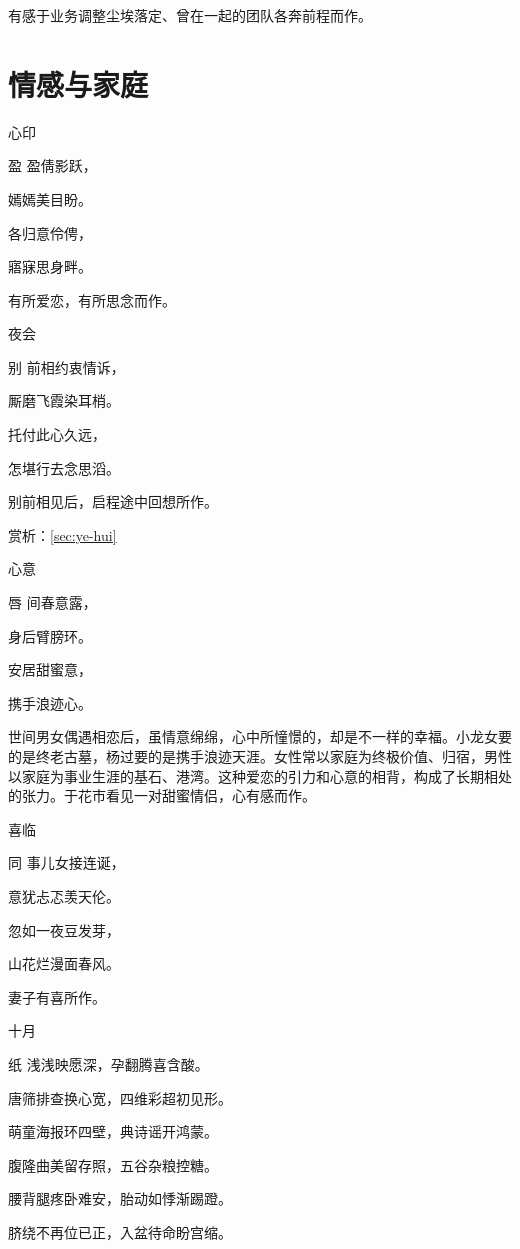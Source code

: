 \documentclass{article}
\newenvironment{poem}[3]{
\begin{minipage}{\textwidth}
\begin{pinyinscope}\begin{center}\Large\linespread{1.4}\selectfont #2\end{center}\end{pinyinscope}
\begin{pinyinscope}
	\begin{center}
	\Large\linespread{1.4}\rmfamily\selectfont #3
}{\end{center}
\end{pinyinscope}
\end{minipage}
}
\begin{document}
有感于业务调整尘埃落定、曾在一起的团队各奔前程而作。

\section{情感与家庭}

\begin{poem}{}{心印}
盈盈倩影跃，

嫣嫣美目盼。

各归意伶俜，

寤寐思身畔。
\end{poem}

有所爱恋，有所思念而作。

\begin{poem}{}{夜会}
别前相约衷情诉，

厮磨飞霞染耳梢。

托付此心{}久远，

怎堪行去念思滔。
\end{poem}

别前相见后，启程途中回想所作。

赏析：\ref{sec:ye-hui}

\begin{poem}{}{心意}
唇间春意露，

身后臂膀环。

安居甜蜜意，

携手浪迹心。
\end{poem}

世间男女偶遇相恋后，虽情意绵绵，心中所憧憬的，却是不一样的幸福。小龙女要的是终老古墓，杨过要的是携手浪迹天涯。女性常以家庭为终极价值、归宿，男性以家庭为事业生涯的基石、港湾。这种爱恋的引力和心意的相背，构成了长期相处的张力。于花市看见一对甜蜜情侣，心有感而作。

\begin{poem}{}{喜临}
同事儿女接连诞，

意犹忐忑羡天伦。

忽如一夜豆发芽，

山花烂漫面春风。
\end{poem}

妻子有喜所作。

\begin{poem}{}{十月}
纸{}浅浅映愿深，孕{}翻腾喜含酸。

唐筛排查换心宽，四维彩超初见形。

萌童海报环四壁，典{}诗谣开鸿蒙。

腹隆曲美留存照，五谷杂粮控{}糖。

腰背腿疼卧难安，胎动如悸渐踢蹬。

脐绕不再位已正，入盆待命盼宫缩。
\end{poem}
\end{document}
